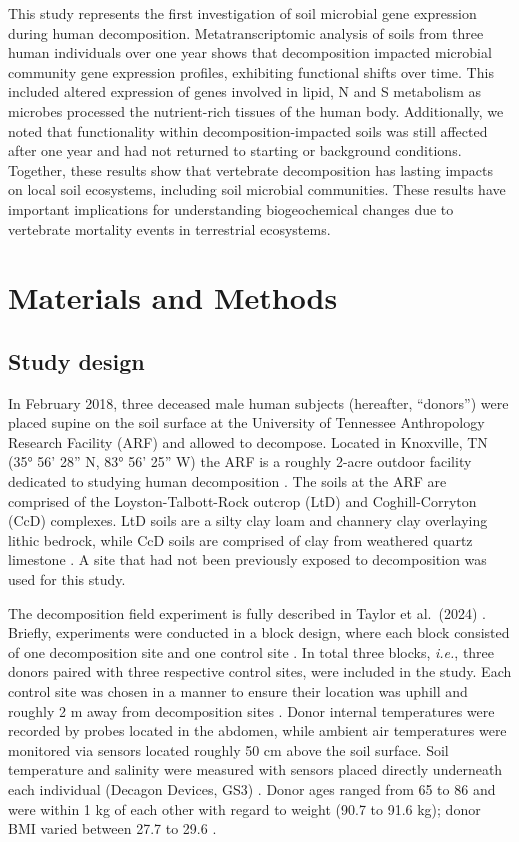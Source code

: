 \documentclass[
  sn-nature,
  lineno, referee]{sn-jnl}
\begin{document}
This study represents the first investigation of soil microbial gene
expression during human decomposition. Metatranscriptomic analysis of
soils from three human individuals over one year shows that
decomposition impacted microbial community gene expression profiles,
exhibiting functional shifts over time. This included altered expression
of genes involved in lipid, N and S metabolism as microbes processed the
nutrient-rich tissues of the human body. Additionally, we noted that
functionality within decomposition-impacted soils was still affected
after one year and had not returned to starting or background
conditions. Together, these results show that vertebrate decomposition
has lasting impacts on local soil ecosystems, including soil microbial
communities. These results have important implications for understanding
biogeochemical changes due to vertebrate mortality events in terrestrial
ecosystems.

\section{Materials and Methods}\label{materials-and-methods}

\subsection{Study design}\label{study-design}

In February 2018, three deceased male human subjects (hereafter,
``donors'') were placed supine on the soil surface at the University of
Tennessee Anthropology Research Facility (ARF) and allowed to decompose.
Located in Knoxville, TN (35° 56' 28'' N, 83° 56' 25'' W) the ARF is a
roughly 2-acre outdoor facility dedicated to studying human
decomposition \citep{keenan_spatial_2018}. The soils at the ARF are
comprised of the Loyston-Talbott-Rock outcrop (LtD) and Coghill-Corryton
(CcD) complexes. LtD soils are a silty clay loam and channery clay
overlaying lithic bedrock, while CcD soils are comprised of clay from
weathered quartz limestone
\citep{keenan_spatial_2018, taylor_transient_2024}. A site that had not
been previously exposed to decomposition was used for this study.

The decomposition field experiment is fully described in Taylor et
al.~(2024) \citep{taylor_transient_2024}. Briefly, experiments were
conducted in a block design, where each block consisted of one
decomposition site and one control site \citep{taylor_transient_2024}.
In total three blocks, \emph{i.e.}, three donors paired with three
respective control sites, were included in the study. Each control site
was chosen in a manner to ensure their location was uphill and roughly 2
m away from decomposition sites \citep{taylor_transient_2024}. Donor
internal temperatures were recorded by probes located in the abdomen,
while ambient air temperatures were monitored via sensors located
roughly 50 cm above the soil surface. Soil temperature and salinity were
measured with sensors placed directly underneath each individual
(Decagon Devices, GS3) \citep{taylor_transient_2024}. Donor ages ranged
from 65 to 86 and were within 1 kg of each other with regard to weight
(90.7 to 91.6 kg); donor BMI varied between 27.7 to 29.6
\citep{taylor_transient_2024}.
\end{document}
